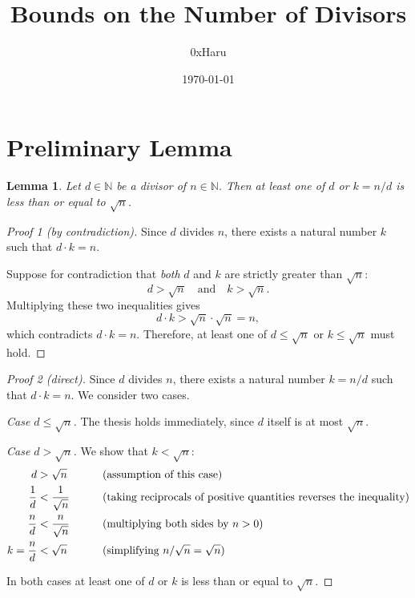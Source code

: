 \documentclass[12pt]{article}
\title{\textbf{Bounds on the Number of Divisors}}
\author{0xHaru}
\date{\today}
\newtheorem{lemma}{Lemma}
\theoremstyle{remark}
\begin{document}
\maketitle

\section*{Preliminary Lemma}

\begin{lemma}
Let $d \in \mathbb{N}$ be a divisor of $n \in \mathbb{N}$.  Then at least one of $d$
or $k = n/d$ is less than or equal to $\sqrt{n}$.
\end{lemma}

\begin{proof}[Proof 1 (by contradiction)]
Since $d$ divides $n$, there exists a natural number $k$ such that $d \cdot k = n$.

Suppose for contradiction that \emph{both} $d$ and $k$ are strictly greater
than $\sqrt{n}$:
\[
    d > \sqrt{n} \quad \text{and} \quad k > \sqrt{n}.
\]
Multiplying these two inequalities gives
\[
    d \cdot k > \sqrt{n} \cdot \sqrt{n} = n,
\]
which contradicts $d \cdot k = n$.  Therefore, at least one of $d \leq \sqrt{n}$
or $k \leq \sqrt{n}$ must hold.
\end{proof}

\smallskip

\begin{proof}[Proof 2 (direct)]
Since $d$ divides $n$, there exists a natural number $k = n/d$ such that
$d \cdot k = n$.  We consider two cases.

\medskip
\noindent\textit{Case $d \leq \sqrt{n}$.}\;
The thesis holds immediately, since $d$ itself is at most $\sqrt{n}$.

\medskip
\noindent\textit{Case $d > \sqrt{n}$.}\;
We show that $k < \sqrt{n}$:
\begin{alignat}{2}
    d &> \sqrt{n}
        &\qquad& \text{(assumption of this case)} \notag \\
    \frac{1}{d} &< \frac{1}{\sqrt{n}}
        &\qquad& \text{(taking reciprocals of positive quantities reverses the inequality)} \notag \\
    \frac{n}{d} &< \frac{n}{\sqrt{n}}
        &\qquad& \text{(multiplying both sides by $n > 0$)} \notag \\
    k = \frac{n}{d} &< \sqrt{n}
        &\qquad& \text{(simplifying $n/\sqrt{n} = \sqrt{n}$)} \notag
\end{alignat}

\medskip
\noindent In both cases at least one of $d$ or $k$ is less than or equal to
$\sqrt{n}$.
\end{proof}
\end{document}
